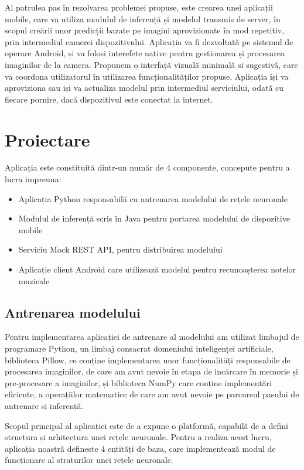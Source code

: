 	Al patrulea pas în rezolvarea problemei propuse, este crearea unei aplicații mobile, care va utiliza modulul de inferență și modelul transmis de server, în scopul creării unor predicții bazate pe imagini aprovizionate în mod repetitiv, prin intermediul camerei dispozitivului.  
	Aplicația va fi dezvoltată pe sistemul de operare Android, și va folosi interefete native pentru gestionarea și procesarea imaginilor de la camera. 
	Propunem o interfață vizuală minimală si sugestivă, care va coordona utilizatorul în utilizarea funcționalităților propuse.
	Aplicația își va aproviziona sau iși va actualiza modelul prin intermediul serviciului, odată cu fiecare pornire, dacă dispozitivul este conectat la internet. 

	\section{Proiectare}
	
	Aplicația este constituită dintr-un număr de 4 componente, concepute pentru a lucra impreuna: 
	
	\begin{itemize}	
	\item	Aplicația Python responsabilă cu  antrenarea modelului de rețele neuronale
	\item	Modulul de inferență scris în Java pentru portarea modelului de dispozitive mobile
	\item	Serviciu Mock REST API, pentru distribuirea modelului
	\item	Aplicație client Android care utilizează modelul pentru recunoașterea notelor muzicale
	\end{itemize}
	
	\subsection{Antrenarea modelului}
	
	Pentru implementarea aplicației de antrenare al modelului am utilizat limbajul de programare Python, un limbaj consacrat domeniului inteligenței artificiale, biblioteca Pillow, ce conține implementarea unor funcționalități responsabile de procesarea imaginilor, de care am avut nevoie în etapa de incărcare în memorie și pre-procesare a imaginilor, și biblioteca NumPy care conține implementări eficiente, a operațiilor matematice de care am avut nevoie pe parcursul pasului de antrenare si inferență. 
	
	\vfill
	
	Scopul principal al aplicației este de a expune o platformă, capabilă de a defini structura și arhitectura unei rețele neuronale. Pentru a realiza acest lucru, aplicația noastră defineste 4 entități de baza, care implementează modul de funcționare al straturilor unei rețele neuronale. 
	
